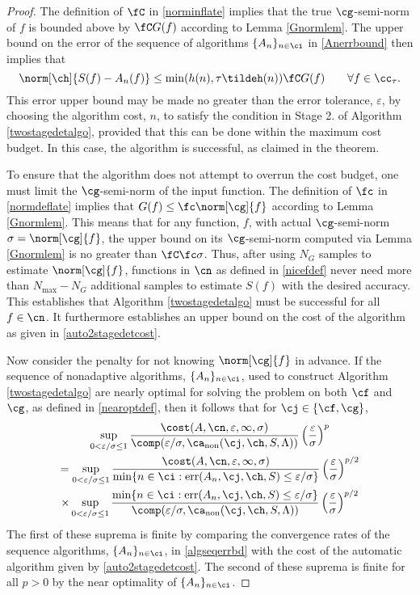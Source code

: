 \documentclass[final]{elsarticle}
\DeclareMathOperator{\err}{err}
\theoremstyle{definition}
\theoremstyle{remark}
\DeclareMathOperator{\fix}{non}
\begin{document}
\begin{proof} The definition of $\fC$ in \eqref{norminflate} implies that the true $\cg$-semi-norm of $f$ is bounded above by $\fC G(f)$ according to Lemma \ref{Gnormlem}.  The upper bound on the error of the sequence of algorithms $\{A_n\}_{n \in \ci}$ in \eqref{Anerrbound} then implies that 
\[
\norm[\ch]{S(f) -  A_n(f)} \le \min(h(n),\tau \tildeh(n)) \fC G(f) \qquad \forall f \in \cc_{\tau}.
\]
This error upper bound may be made no greater than the error tolerance, $\varepsilon$, by choosing the algorithm cost, $n$, to satisfy the condition in Stage 2. of Algorithm \ref{twostagedetalgo}, provided that this can be done within the maximum cost budget.  In this case, the algorithm is successful, as claimed in the theorem.

To ensure that the algorithm does not attempt to overrun the cost budget, one must limit the $\cg$-semi-norm of the input function.  The definition of  $\fc$ in \eqref{normdeflate} implies that $G(f) \le \fc\norm[\cg]{f}$ according to Lemma \ref{Gnormlem}. This means that for any function, $f$, with actual $\cg$-semi-norm $\sigma=\norm[\cg]{f}$, the upper bound on its $\cg$-semi-norm computed via Lemma \ref{Gnormlem} is no greater than $\fC \fc \sigma$.  Thus, after using $N_G$ samples to estimate $\norm[\cg]{f}$, functions in $\cn$ as defined in \eqref{nicefdef} never need more than $N_{\max} - N_G$ additional samples to estimate $S(f)$ with the desired accuracy.  This establishes that Algorithm \ref{twostagedetalgo} must be successful for all $f \in \cn$.  It furthermore establishes an upper bound on the cost of the algorithm as given in \eqref{auto2stagedetcost}.

Now consider the penalty for not knowing $\norm[\cg]{f}$ in advance.  If the sequence of nonadaptive algorithms, $\{A_n\}_{n \in \ci}$, used to construct Algorithm \ref{twostagedetalgo} are nearly optimal for solving the problem on both $\cf$ and $\cg$, as defined in \eqref{nearoptdef}, then it follows that for $\cj \in \{\cf,\cg\}$,
\begin{multline*}
\sup_{0 < \varepsilon/\sigma \le 1} \frac{\cost(A,\cn,\varepsilon,\infty,\sigma)} {\comp(\varepsilon/\sigma,\ca_{\fix}(\cj,\ch,S,\Lambda))} \left(\frac{\varepsilon}{\sigma}\right)^{p} \\
= \sup_{0 < \varepsilon/\sigma \le 1} \frac{\cost(A,\cn,\varepsilon,\infty,\sigma)}{\min\{n \in \ci : \err(A_n,\cj,\ch,S) \le \varepsilon/\sigma\}} \left(\frac{\varepsilon}{\sigma}\right)^{p/2}  \\
 \times \sup_{0 < \varepsilon/\sigma \le 1} \frac{\min\{n \in \ci : \err(A_n,\cj,\ch,S) \le \varepsilon/\sigma\}} {\comp(\varepsilon/\sigma,\ca_{\fix}(\cj,\ch,S,\Lambda))} \left(\frac{\varepsilon}{\sigma}\right)^{p/2}
\end{multline*} 
The first of these suprema is finite by comparing the convergence rates of the sequence algorithms, $\{A_n\}_{n \in \ci}$, in \eqref{algseqerrbd} with the cost of the automatic algorithm given by \eqref{auto2stagedetcost}. The second of these suprema is finite for all $p>0$ by the near optimality of $\{A_n\}_{n \in \ci}$.  
\end{proof}
\end{document}
